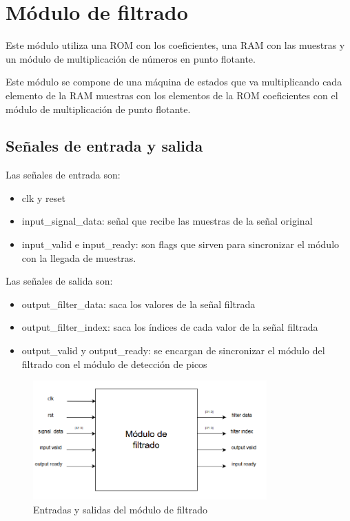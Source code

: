 \section{Módulo de filtrado}

Este módulo utiliza una ROM con los coeficientes, una RAM con las muestras y un módulo de multiplicación
de números en punto flotante.

Este módulo se compone de una máquina de estados que va multiplicando cada elemento de la RAM muestras 
con los elementos de la ROM coeficientes con el módulo de multiplicación de punto flotante.

\subsection{Señales de entrada y salida}

Las señales de entrada son:

\begin{itemize}
\item clk y reset
\item input\_signal\_data: señal que recibe las muestras de la señal original 
\item input\_valid e input\_ready: son flags que sirven para sincronizar el módulo con la llegada de muestras. 
\end{itemize}

Las señales de salida son:

\begin{itemize}
    \item output\_filter\_data: saca los valores de la señal filtrada
    \item output\_filter\_index: saca los índices de cada valor de la señal filtrada
    \item output\_valid y output\_ready: se encargan de sincronizar el módulo del filtrado 
    con el módulo de detección de picos
\end{itemize}

\begin{figure}[h!]
    \centering
    \includegraphics[width=0.8\textwidth]{./Images/img_implementacion_hw/diagramamodulofiltrado.png}
    \caption{Entradas y salidas del módulo de filtrado}
    \label{fig:modfiltrado}
\end{figure} 

